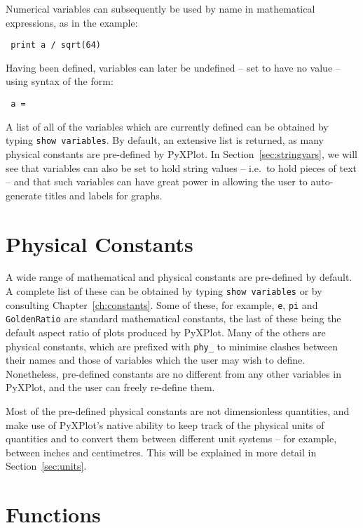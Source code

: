 \noindent Numerical variables can subsequently be used by name in mathematical
expressions, as in the example:

\begin{verbatim} print a / sqrt(64) \end{verbatim}

\noindent Having been defined, variables can later be undefined -- set to have
no value -- using syntax of the form:

\begin{verbatim} a = \end{verbatim}

A list of all of the variables which are currently defined can be obtained by
typing {\tt show variables}. By default, an extensive
list is returned, as many physical constants are pre-defined by PyXPlot. In
Section~\ref{sec:stringvars}, we will see that variables can also be set to
hold string values -- i.e.\ to hold pieces of text -- and that such variables
can have great power in allowing the user to auto-generate titles and labels
for graphs.

\section{Physical Constants} \label{sec:constants} 

A wide range of mathematical and physical constants are pre-defined by default.
A complete list of these can be obtained by typing {\tt show variables} or by
consulting Chapter~\ref{ch:constants}. Some of these, for example, {\tt e},
{\tt pi} and {\tt GoldenRatio} are standard mathematical constants, the last of
these being the default aspect ratio of plots produced by PyXPlot. Many of the
others are physical constants, which are prefixed with {\tt phy\_} to minimise
clashes between their names and those of variables which the user may wish to
define.  Nonetheless, pre-defined constants are no different from any other
variables in PyXPlot, and the user can freely re-define them.

Most of the pre-defined physical constants are not dimensionless quantities,
and make use of PyXPlot's native ability to keep track of the physical units of
quantities and to convert them between different unit systems -- for example,
between inches and centimetres.  This will be explained in more detail in
Section~\ref{sec:units}.

\section{Functions} \label{sec:functions}

